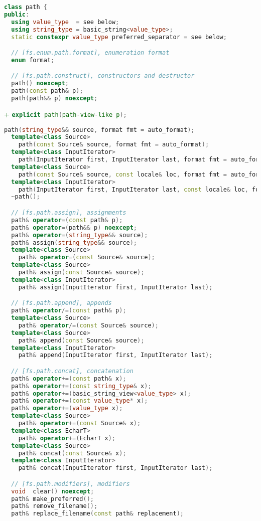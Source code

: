 \documentclass[11pt]{article}
\newcommand{\code}[2][cpp]{\lstinline[language=#1,basicstyle=\small\ttfamily]{#2}}
\newcommand{\tsreplace}[3]{\textcolor{red}{\sout{#1}}#2\textcolor{darkgreen}{#3}}
\begin{document}
\begin{lstlisting}[language=cpp]
class path {
public:
  using value_type  = see below;
  using string_type = basic_string<value_type>;
  static constexpr value_type preferred_separator = see below;

  // [fs.enum.path.format], enumeration format
  enum format;

  // [fs.path.construct], constructors and destructor
  path() noexcept;
  path(const path& p);
  path(path&& p) noexcept;
\end{lstlisting}
\tsreplace{}{}{+ \code{explicit path(path-view-like p);}}
\begin{lstlisting}[language=cpp]
  path(string_type&& source, format fmt = auto_format);
  template<class Source>
    path(const Source& source, format fmt = auto_format);
  template<class InputIterator>
    path(InputIterator first, InputIterator last, format fmt = auto_format);
  template<class Source>
    path(const Source& source, const locale& loc, format fmt = auto_format);
  template<class InputIterator>
    path(InputIterator first, InputIterator last, const locale& loc, format fmt = auto_format);
  ~path();

  // [fs.path.assign], assignments
  path& operator=(const path& p);
  path& operator=(path&& p) noexcept;
  path& operator=(string_type&& source);
  path& assign(string_type&& source);
  template<class Source>
    path& operator=(const Source& source);
  template<class Source>
    path& assign(const Source& source);
  template<class InputIterator>
    path& assign(InputIterator first, InputIterator last);

  // [fs.path.append], appends
  path& operator/=(const path& p);
  template<class Source>
    path& operator/=(const Source& source);
  template<class Source>
    path& append(const Source& source);
  template<class InputIterator>
    path& append(InputIterator first, InputIterator last);

  // [fs.path.concat], concatenation
  path& operator+=(const path& x);
  path& operator+=(const string_type& x);
  path& operator+=(basic_string_view<value_type> x);
  path& operator+=(const value_type* x);
  path& operator+=(value_type x);
  template<class Source>
    path& operator+=(const Source& x);
  template<class EcharT>
    path& operator+=(EcharT x);
  template<class Source>
    path& concat(const Source& x);
  template<class InputIterator>
    path& concat(InputIterator first, InputIterator last);

  // [fs.path.modifiers], modifiers
  void  clear() noexcept;
  path& make_preferred();
  path& remove_filename();
  path& replace_filename(const path& replacement);
\end{lstlisting}
\end{document}
